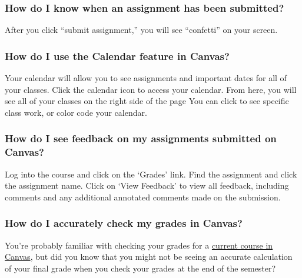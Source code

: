 \documentclass[
]{book}
\begin{document}
\hypertarget{how-do-i-know-when-an-assignment-has-been-submitted}{%
\subsubsection{How do I know when an assignment has been submitted?}\label{how-do-i-know-when-an-assignment-has-been-submitted}}

After you click ``submit assignment,'' you will see ``confetti'' on your screen.

\hypertarget{how-do-i-use-the-calendar-feature-in-canvas}{%
\subsubsection{How do I use the Calendar feature in Canvas?}\label{how-do-i-use-the-calendar-feature-in-canvas}}

Your calendar will allow you to see assignments and important dates for all of your classes.
Click the calendar icon to access your calendar.
From here, you will see all of your classes on the right side of the page
You can click to see specific class work, or color code your calendar.

\hypertarget{how-do-i-see-feedback-on-my-assignments-submitted-on-canvas}{%
\subsubsection{How do I see feedback on my assignments submitted on Canvas?}\label{how-do-i-see-feedback-on-my-assignments-submitted-on-canvas}}

Log into the course and click on the `Grades' link.
Find the assignment and click the assignment name.
Click on `View Feedback' to view all feedback, including comments and any additional annotated comments made on the submission.

\hypertarget{how-do-i-accurately-check-my-grades-in-canvas}{%
\subsubsection{How do I accurately check my grades in Canvas?}\label{how-do-i-accurately-check-my-grades-in-canvas}}

You're probably familiar with checking your grades for a \href{https://community.canvaslms.com/t5/Student-Guide/How-do-I-view-my-grades-in-a-current-course/ta-p/493}{current course in Canvas}, but did you know that you might not be seeing an accurate calculation of your final grade when you check your grades at the end of the semester?
\end{document}
